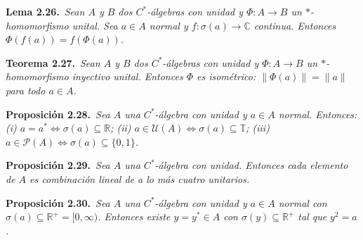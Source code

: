 \documentclass[11pt]{article}
\newcommand{\U}{\mathcal{U}}
\newcommand{\Pj}{\mathcal{P}}
\newcommand{\T}{\mathbb{T}}
\newenvironment{teorema}[1]{\par\medskip\noindent\textbf{Teorema #1.}\ \itshape}{\par\medskip}
\newenvironment{proposicion}[1]{\par\medskip\noindent\textbf{Proposición #1.}\ \itshape}{\par\medskip}
\newenvironment{lema}[1]{\par\medskip\noindent\textbf{Lema #1.}\ \itshape}{\par\medskip}
\begin{document}
\begin{lema}{2.26}Sean $A$ y $B$ dos $C^*$-álgebras con unidad y $\Phi:A\to B$ un $*$-homomorfismo unital. Sea $a\in A$ normal y $f:\sigma(a)\to\mathbb C$ continua. Entonces $\Phi(f(a))=f(\Phi(a))$.\end{lema}
\begin{teorema}{2.27}Sean $A$ y $B$ dos $C^*$-álgebras con unidad y $\Phi:A\to B$ un $*$-homomorfismo inyectivo unital. Entonces $\Phi$ es isométrico: $\lVert\Phi(a)\rVert=\lVert a\rVert$ para todo $a\in A$.\end{teorema}
\begin{proposicion}{2.28}Sea $A$ una $C^*$-álgebra con unidad y $a\in A$ normal. Entonces: (i) $a=a^*\Longleftrightarrow\sigma(a)\subseteq\mathbb R$; (ii) $a\in\U(A)\Longleftrightarrow\sigma(a)\subseteq\T$; (iii) $a\in\Pj(A)\Longleftrightarrow\sigma(a)\subseteq\{0,1\}$.\end{proposicion}
\begin{proposicion}{2.29}Sea $A$ una $C^*$-álgebra con unidad. Entonces cada elemento de $A$ es combinación lineal de a lo más cuatro unitarios.\end{proposicion}
\begin{proposicion}{2.30}Sea $A$ una $C^*$-álgebra con unidad y $a\in A$ normal con $\sigma(a)\subseteq\mathbb R^+=[0,\infty)$. Entonces existe $y=y^*\in A$ con $\sigma(y)\subseteq\mathbb R^+$ tal que $y^2=a$.\end{proposicion}
\end{document}
